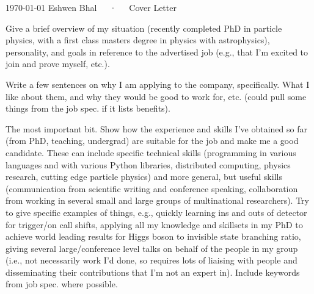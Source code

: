 \documentclass[12pt, a4paper]{awesome-cv}
\begin{document}
\makecvheader[C]

 \makecvfooter
   {\today}
   {Eshwen Bhal~~~·~~~Cover Letter}
   {\thepage}

\makelettertitle

\begin{cvletter}

Give a brief overview of my situation (recently completed PhD in particle physics, with a first class masters degree in physics with astrophysics), personality, and goals in reference to the advertised job (e.g., that I'm excited to join and prove myself, etc.).

Write a few sentences on why I am applying to the company, specifically. What I like about them, and why they would be good to work for, etc. (could pull some things from the job spec. if it lists benefits).
    
The most important bit. Show how the experience and skills I've obtained so far (from PhD, teaching, undergrad) are suitable for the job and make me a good candidate. These can include specific technical skills (programming in various languages and with various Python libraries, distributed computing, physics research, cutting edge particle physics) and more general, but useful skills (communication from scientific writing and conference speaking, collaboration from working in several small and large groups of multinational researchers). Try to give specific examples of things, e.g., quickly learning ins and outs of detector for trigger/on call shifts, applying all my knowledge and skillsets in my PhD to achieve world leading results for Higgs boson to invisible state branching ratio, giving several large/conference level talks on behalf of the people in my group (i.e., not necessarily work I'd done, so requires lots of liaising with people and disseminating their contributions that I'm not an expert in). Include keywords from job spec. where possible.
    
\end{cvletter}
    
\makeletterclosing
    
\end{document}
